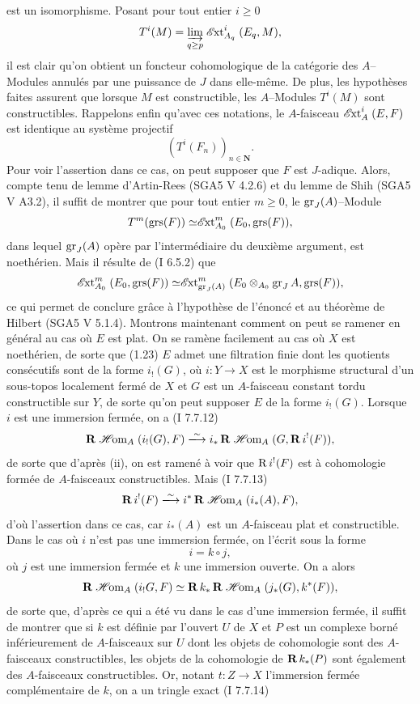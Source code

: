 est un isomorphisme. Posant pour tout entier $i \geq 0$
$$
T^i(M) = \varinjlim_{q \geq p}\mathrel{\mathscr{E}\mkern-2mu\text{\upshape xt}}^i_{A_q}(E_q, M),
$$
il est clair qu'on obtient un foncteur cohomologique de la catégorie des $A$--Modules annulés par une puissance de $J$ dans elle-même. De plus, les hypothèses faites assurent que lorsque $M$ est constructible, les $A$--Modules $T^i(M)$ sont constructibles. Rappelons enfin qu'avec ces notations, le $A$-faisceau $\mathrel{\mathscr{E}\mkern-2mu\text{\upshape xt}}^i_A(E, F)$ est identique au système projectif
$$
(T^i(F_n))_{n \in \mathbf{N}}.
$$
Pour voir l'assertion dans ce cas, on peut supposer que $F$ est $J$-adique. Alors, compte tenu de lemme d'Artin-Rees (SGA5 V 4.2.6) et du lemme de Shih (SGA5 V A3.2), il suffit de montrer que pour tout entier $m \geq 0$, le $\operatorname{gr}_J(A)$--Module
$$
T^m(\operatorname{grs}(F)) \simeq \mathrel{\mathscr{E}\mkern-2mu\text{\upshape xt}}^m_{A_0}(E_0, \operatorname{grs}(F)),
$$
dans lequel $\operatorname{gr}_J(A)$ opère par l'intermédiaire du deuxième argument, est noethérien. Mais il résulte de (I 6.5.2) que 
$$
\mathrel{\mathscr{E}\mkern-2mu\text{\upshape xt}}^m_{A_0}(E_0, \operatorname{grs}(F)) \simeq \mathrel{\mathscr{E}\mkern-2mu\text{\upshape xt}}^m_{\operatorname{gr}_J(A)}(E_0 \otimes_{A_0}\operatorname{gr}_J A, \operatorname{grs}(F)),
$$
ce qui permet de conclure grâce à l'hypothèse de l'énoncé et au théorème de Hilbert (SGA5 V 5.1.4). Montrons maintenant comment on peut se ramener en général au cas où $E$ est plat. On se ramène facilement au cas où $X$ est noethérien, de sorte que (1.23) $E$ admet une filtration finie dont les quotients consécutifs sont de la forme $i_!(G)$, où $i: Y \to X$ est le morphisme structural d'un sous-topos localement fermé de $X$ et $G$ est un $A$-faisceau constant tordu constructible sur $Y$, de sorte qu'on peut supposer $E$ de la forme $i_!(G)$. Lorsque $i$ est une immersion fermée, on a (I 7.7.12)
$$
\bRd \cHom_A(i_!(G), F) \isomlong i_* \bRd \cHom_A(G, \bRd i^!(F)),
$$
de sorte que d'après (ii), on est ramené à voir que $\operatorname{\mathrel{R}} i^!(F)$ est à cohomologie formée de $A$-faisceaux constructibles. Mais (I 7.7.13)
$$
\bRd i^!(F) \isomlong i^* \bRd\cHom_A(i_*(A), F),
$$
d'où l'assertion dans ce cas, car $i_*(A)$ est un $A$-faisceau plat et constructible. Dans le cas où $i$ n'est pas une immersion fermée, on l'écrit sous la forme 
$$
i = k \circ j,
$$
où $j$ est une immersion fermée et $k$ une immersion ouverte. On a alors 
$$
\operatorname*{\mathrm{\mathbf{R}}} \mathrel{\mathscr{H}\mkern-2mu\text{\upshape om}}_A(i_!G, F) \simeq \operatorname*{\mathrm{\mathbf{R}}} k_* \operatorname*{\mathrm{\mathbf{R}}}\mathrel{\mathscr{H}\mkern-2mu\text{\upshape om}}_A(j_*(G), k^*(F)),
$$
de sorte que, d'après ce qui a été vu dans le cas d'une immersion fermée, il suffit de montrer que si $k$ est définie par l'ouvert $U$ de $X$ et $P$ est un complexe borné inférieurement de $A$-faisceaux sur $U$ dont les objets de cohomologie sont des $A$-faisceaux constructibles, les objets de la cohomologie de $\operatorname*{\mathrm{\mathbf{R}}} k_*(P)$ sont également des $A$-faisceaux constructibles. Or, notant $t: Z \to X$ l'immersion fermée complémentaire de $k$, on a un tringle exact (I 7.7.14)
